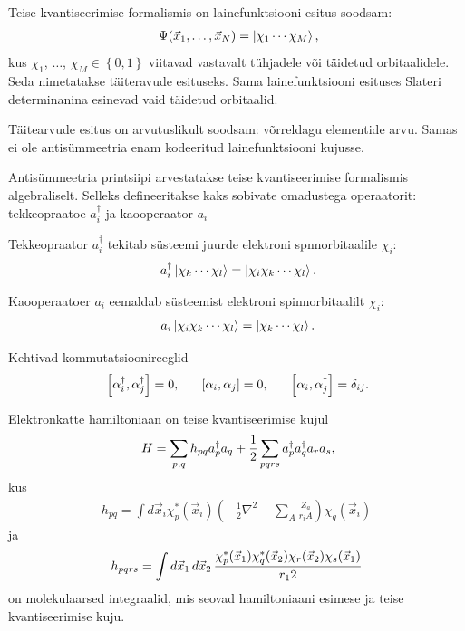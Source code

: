 \documentclass[12pt]{report}
\def\paren#1{\left(#1\right)}
\def\sparen#1{\left[#1\right]}
\def\cparen#1{\left\{#1\right\}}
\def\d#1{\mathinner{d#1}}
\def\ket#1{\mathinner{|#1\rangle}}
\begin{document}
Teise kvantiseerimise formalismis on lainefunktsiooni esitus soodsam:
\begin{align}
    \Psi(\vec{x}_1, \ldots, \vec{x}_N)=\ket{\chi_1\cdots \chi_M} \rlap{,}
\end{align}
kus \(\chi_1\), \(\ldots\), \(\chi_M \in \cparen{0, 1}\) viitavad vastavalt tühjadele või täidetud orbitaalidele.
Seda nimetatakse täiteravude esituseks.
Sama lainefunktsiooni esituses Slateri determinanina esinevad vaid täidetud orbitaalid.

Täitearvude esitus on arvutuslikult soodsam: võrreldagu elementide arvu.
Samas ei ole antisümmeetria enam kodeeritud lainefunktsiooni kujusse.

Antisümmeetria printsiipi arvestatakse teise kvantiseerimise formalismis algebraliselt.
Selleks defineeritakse kaks sobivate omadustega operaatorit: tekkeopraatoe \(a_i^\dagger\) ja kaooperaator \(a_i\)

Tekkeopraator \(a_i^\dagger\) tekitab süsteemi juurde elektroni spnnorbitaalile \(\chi_i\):
\begin{align}
    a_i^\dagger \ket{\chi_k \cdots \chi_l} = \ket{\chi_i \chi_k \cdots \chi_l} \rlap{.}
\end{align}

Kaooperaatoer \(a_i\) eemaldab süsteemist elektroni spinnorbitaalilt \(\chi_i\):
\begin{align}
    a_i \ket{\chi_i \chi_k \cdots \chi_l} = \ket{\chi_k \cdots \chi_l}\rlap{.}
\end{align}

Kehtivad kommutatsioonireeglid
\begin{align}\label{eq:comrules}
    \sparen{\alpha_i^\dagger, \alpha_j^\dagger} = 0 \rlap{,}
    \qquad \sparen{\alpha_i, \alpha_j} = 0 \rlap{,}
    \qquad \sparen{\alpha_i, \alpha_j^\dagger} = \delta_{ij} \rlap{.}
\end{align}

Elektronkatte hamiltoniaan on teise kvantiseerimise kujul
\begin{align}
    H=\sum_{p,q}h_{pq}a_p^\dagger a_q + \frac{1}{2} \sum_{pqrs} a_p^\dagger a_q^\dagger a_r a_s \rlap{,}
\end{align}
kus
\begin{align}\label{eq:molint1}
    h_{pq} = \int d{\vec{x}_i} \chi_p^*(\vec{x}_i)
    \paren{-\frac{1}{2} \nabla^2 - \sum_A \frac{Z_a}{r_iA}} \chi_q(\vec{x}_i)
\end{align}
ja
\begin{align}\label{eq:molin2}
    h_{pqrs} = \int \d{\vec{x}_1} \d{\vec{x}_2}
    \frac{\chi_p^*(\vec{x}_1) \chi_q^*(\vec{x}_2) \chi_r(\vec{x}_2) \chi_s(\vec{x}_1)}{r_12}
\end{align}
on molekulaarsed integraalid, mis seovad hamiltoniaani esimese ja teise kvantiseerimise kuju.
\end{document}

